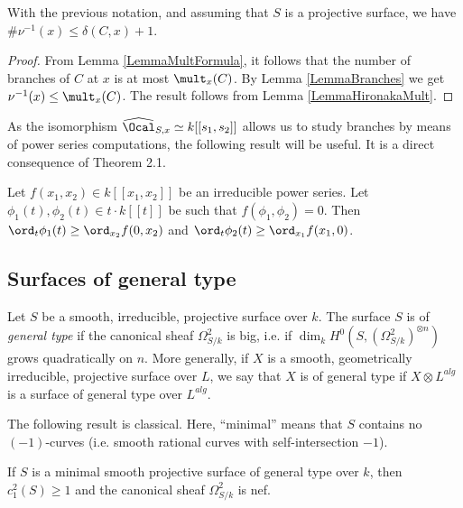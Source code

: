 \begin{lemma}
\notready \label{LemmaBounddelta} With the previous notation, and assuming that $S$ is a projective surface, we have $\#\nu^{-1}(x)\le \delta(C,x)+1$.
\end{lemma}
\begin{proof} From Lemma \ref{LemmaMultFormula}, it follows that the number of branches of $C$ at $x$ is at most $\mult_x(C)$. By Lemma \ref{LemmaBranches} we get $\nu^{-1}(x)\le \mult_x(C)$. The result follows from Lemma \ref{LemmaHironakaMult}.
\end{proof}


As the isomorphism $\widehat{\Ocal}_{S,x}\simeq  k[[s_1,s_2]]$ allows us to study branches by means of power series computations, the following result will be useful. It is a direct consequence of \cite{Ploski} Theorem 2.1.
\begin{lemma}
\notready \label{LemmaPloski} Let $f(x_1,x_2)\in k[[x_1,x_2]]$ be an irreducible power series. Let $\phi_1(t),\phi_2(t)\in t\cdot k[[t]]$ be such that $f(\phi_1,\phi_2)=0$. Then $\ord_t\phi_1(t)\ge \ord_{x_2} f(0,x_2)$ and $\ord_t\phi_2(t)\ge \ord_{x_1} f(x_1,0)$.
\end{lemma}




\subsection{Surfaces of general type} Let $S$ be a smooth, irreducible, projective surface over $k$.  The surface $S$ is of \emph{general type} if the canonical sheaf $\Omega^2_{S/k}$ is big, i.e. if $\dim_kH^0(S,(\Omega^2_{S/k})^{\otimes n})$ grows quadratically on $n$. More generally, if $X$ is a smooth, geometrically irreducible, projective surface over $L$, we say that $X$ is of general type if $X\otimes L^{alg}$ is a surface of general type over $L^{alg}$.

The following result is classical. Here, ``minimal'' means that $S$ contains no $(-1)$-curves (i.e. smooth rational curves with self-intersection $-1$).

\begin{lemma}
\notready \label{LemmaNef} If $S$ is a minimal smooth projective surface of general type over $k$, then $c_1^2(S)\ge 1$ and the canonical sheaf $\Omega^2_{S/k}$ is nef.
\end{lemma}

